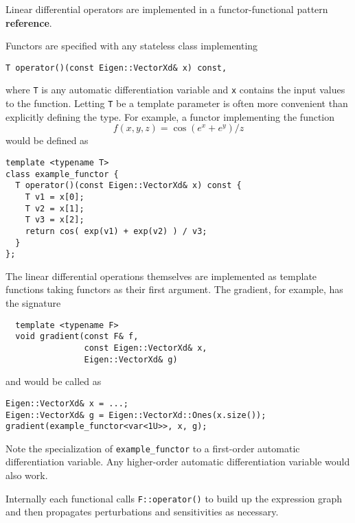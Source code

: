 Linear differential operators are implemented in a functor-functional
pattern \textbf{reference}.

Functors are specified with any stateless class implementing
%
\begin{verbatim}
T operator()(const Eigen::VectorXd& x) const,
\end{verbatim}
%
where \verb|T| is any automatic differentiation variable and \verb|x|
contains the input values to the function.  Letting \verb|T| be
a template parameter is often more convenient than explicitly
defining the type.  For example, a functor implementing the function
%
\begin{equation*}
f \! \left( x, y, z \right) = \cos \! \left( e^{x} + e^{y} \right) / z
\end{equation*}
%
would be defined as
%
\begin{verbatim}
template <typename T>
class example_functor {
  T operator()(const Eigen::VectorXd& x) const {
    T v1 = x[0];
    T v2 = x[1];
    T v3 = x[2];
    return cos( exp(v1) + exp(v2) ) / v3;  
  }
};
\end{verbatim}

The linear differential operations themselves are implemented as
template functions taking functors as their first argument.  The 
gradient, for example, has the signature
%
\begin{verbatim}
  template <typename F>
  void gradient(const F& f,
                const Eigen::VectorXd& x,
                Eigen::VectorXd& g)
\end{verbatim}
%
and would be called as
%
\begin{verbatim}
Eigen::VectorXd& x = ...;
Eigen::VectorXd& g = Eigen::VectorXd::Ones(x.size());
gradient(example_functor<var<1U>>, x, g);
\end{verbatim}
%
Note the specialization of \verb|example_functor| to a first-order
automatic differentiation variable.  Any higher-order automatic
differentiation variable would also work.

Internally each functional calls \verb|F::operator()| to build up
the expression graph and then propagates perturbations and
sensitivities as necessary.
